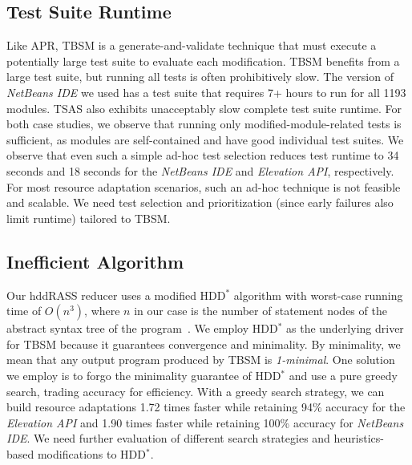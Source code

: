 \subsection{Test Suite Runtime }
Like APR, TBSM is a generate-and-validate technique that must execute a potentially large test suite to evaluate each modification. TBSM benefits from a large test suite, but running all tests is often prohibitively slow. The version of \textit{NetBeans IDE} we used has a test suite that requires 7+ hours to run for all 1193 modules. TSAS also exhibits unacceptably slow complete test suite runtime. For both case studies, we observe that running only modified-module-related tests is sufficient, as modules are self-contained and have good individual test suites. We observe that even such a simple ad-hoc test selection reduces test runtime to 34 seconds and 18 seconds for the \textit{NetBeans IDE} and \textit{Elevation API}, respectively. For most resource adaptation scenarios, such an ad-hoc technique is not feasible and scalable. We need test selection and prioritization (since early failures also limit runtime) tailored to TBSM.

\subsection{Inefficient Algorithm}
Our hddRASS reducer uses a modified HDD$^*$ algorithm with worst-case running time of $O(n^3)$, where $n$ in our case is the number of statement nodes of the abstract syntax tree of the program~\cite{misherghi2006hdd}. We employ HDD$^*$ as the underlying driver for TBSM because it guarantees convergence and minimality. By minimality, we mean that any output program produced by TBSM is \emph{1-minimal}\cite{christi2017saso}. One solution we employ is to forgo the minimality guarantee of HDD$^*$ and use a pure greedy search, trading accuracy for efficiency.  With a greedy search strategy, we can build resource adaptations 1.72 times faster while retaining 94\% accuracy for the \textit{Elevation API} and 1.90 times faster while retaining 100\% accuracy for \textit{NetBeans IDE}. We need further evaluation of different search strategies and heuristics-based modifications to HDD$^*$.

